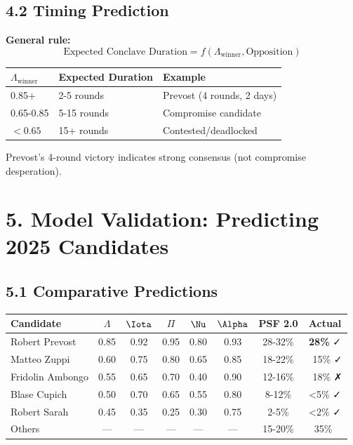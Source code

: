 \documentclass[11pt]{article}
\begin{document}
\subsection{4.2 Timing Prediction}

\textbf{General rule:}
\begin{equation}
\text{Expected Conclave Duration} = f(\Lambda_{\text{winner}}, \text{Opposition})
\end{equation}

\begin{table}[h]
\centering
\begin{tabular}{|l|l|l|}
\hline
$\Lambda_{\text{winner}}$ & \textbf{Expected Duration} & \textbf{Example} \\
\hline
0.85+ & 2-5 rounds & Prevost (4 rounds, 2 days) \\
0.65-0.85 & 5-15 rounds & Compromise candidate \\
$<0.65$ & 15+ rounds & Contested/deadlocked \\
\hline
\end{tabular}
\end{table}

Prevost's 4-round victory indicates strong consensus (not compromise desperation).

\section{5. Model Validation: Predicting 2025 Candidates}

\subsection{5.1 Comparative Predictions}

\begin{longtable}{|l|c|c|c|c|c|c|c|}
\hline
\textbf{Candidate} & $\Lambda$ & $\Iota$ & $\Pi$ & $\Nu$ & $\Alpha$ & \textbf{PSF 2.0} & \textbf{Actual} \\
\hline
\endhead

Robert Prevost & 0.85 & 0.92 & 0.95 & 0.80 & 0.93 & 28-32\% & \textbf{28\%} ✓ \\
Matteo Zuppi & 0.60 & 0.75 & 0.80 & 0.65 & 0.85 & 18-22\% & ~15\% ✓ \\
Fridolin Ambongo & 0.55 & 0.65 & 0.70 & 0.40 & 0.90 & 12-16\% & ~18\% ✗ \\
Blase Cupich & 0.50 & 0.70 & 0.65 & 0.55 & 0.80 & 8-12\% & <5\% ✓ \\
Robert Sarah & 0.45 & 0.35 & 0.25 & 0.30 & 0.75 & 2-5\% & <2\% ✓ \\
Others & — & — & — & — & — & 15-20\% & ~35\% ~ \\
\hline
\end{longtable}
\end{document}
